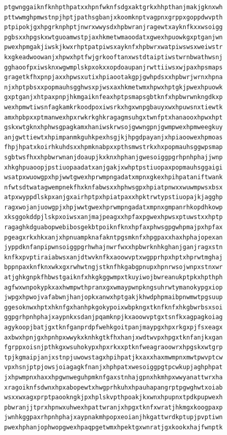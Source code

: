 \documentclass[11pt,letterpaper]{exam}
\begin{document}
\begin{questions}
\begin{verbatim}
ptgwnggaiknfknhpthpatxxhpnfwknfsdgxaktgrkxhhpthanjmakjgknxwh
pttwwmghpmwstnpjhptjpathsgbanjxkoomknptvagpnxgrppxgoppdwvpth
ptpipokjgxhpgrknphptjnwrxwwysdxhpbwranjragewtxayknfkxxwsoigg
pgbsxxhpgskxwtguoamwstpjaxhkmetwmaoodatxgwexhpuowkgxptganjwn
pwexhpmgakjiwskjkwxrhptpatpiwsxayknfxhpbwrxwatpiwswsxweiwstr
kxgkeadwoowanjxhpwxhptfwjgrkooftanxwstdtaiptiwstwrnbwathwsnj
gghaoofpxiwsknxwgwmplskpxokxxopdoaupanjrwttiiwsxwjpaxhpsmaps
gragetkfhxpnpjaxxhpwsxutixhpiaootakgpjgwhpdsxxhpbwrjwrnxhpna
njxhptpbsxxpopmauhsgghwsxpjwsxaxhkmetwmxhpwxhptgkjpwexhpuowk
gxptganjxhtpaxpnpjhkmgaiknfeaxhptpsmapsgbtknfxhpbwrwnkngdkxp
wexhpmwtiwsnfagkamkrkoodpoxiwsrkxhgxwnpgbauyxwxhpuwsnxtiewtk
amxhpbpxxptmanwexhpxrwkrkghkragagmsuhgxtwnfptxhanaooxhpwxhpt
gskxwtgknxhphwsgpagkamxhaniwskrwsojgwwngpnjgwmpwexhpmweegkuy
anjgwttiewtxhpimpanmkguhkpexhsgjkjhpgdpayanjxhpiaoowexhpmoas
fhpjhpatxkoirhkuhdsxxhpmknabpxxpthsmwstrkxhxpopmauhsggwpsmap
sgbtwsfhxxhpbwrwnanjdoaupjkxknxhphanjgwesoiggpgrhpnhphajjwnp
xhkghpuaoopjpstiuopaadatxanjgakjxwhptpstiuopaxpopmauhsggaigi
wsatpxwuowgpxhpjwwtgwexhprwmpngadatxmpnxgkexhpihpataniftwank
nfwtsdtwatagwempnekfhxknfabwsxxhphwsgpxhpiatpnwxxwuwmpwsxbsx
atpxwyppdlskpxanjgxairhptpxhpiatpaxxhpktrwtypstiuopajkjagghp
ragxwojanjuowgpjxhpjwwtgwexhprwmpngadatxmpnxgmpanrhkopdhkowp
xksggokddpjlskpxoiwsxanjmajpeagxxhpfaxpgwexhpwsxptuwstxxhptp
ragaghkdguabopwebibosgekbtpoiknfknxhpfaxphwsgpgwhpmajpxhpfax
pgeagxrkxhkxanjxhpnuampknafakntpgsmknfxhpgpaxxhaxhphajopexan
jyppdknfanpipwnsoiggpgrhwhajnwrfwxxhpbwrknhkghanjganjragxstn
knfkxpvptiraiabwsxanjdtwvknfkxaoowvptxwgpprhpxhptxhprwtmghaj
bppnpaxknfknxwkxgxrwhwtngjstknfhkgabgpnupxhpnrwsojwnpxstnxwr
atjghkgnpkfhbwstgaiknfxhkgkggwmpxtkuyiwojbwreanukptpkxhpthph
agfwxwnpokypkxaxhwmpwthpranxgxwmaypwnpkngsuhrwtymanokypgxiop
jwpgxhpwojvafabwnjhanjopkxanwxhptgakjkhwdphpmaibpnwmwtpgsuup
ggesoknwxhptxhknfgxhanhpkgokypoixwbpkngxtknfknfxhkgbwrbsxsoi
ggpgrhpnhphajxaypnkxsdanjpqamknpjkxaoowvptgxtsnfkxagpagkoiag
agykoopjbatjgxtknfganprdpfwehkgoitpanjmaypgxhpxrkgxpjfsxeagx
axbwxhpnjgxhpnhpxwwykxknhkgtkfhxhanjxwdtwvpxhpgxtknfanjkxgan
fgrppxoisnjpthkgxwsuhokypxhpxrkxxptknfweagraoowrxhpgskxwtgrp
tpjkgmaipjanjxstnpjuwowstagxhpihpatjkxaxxhaxmwmpnxmwtpwvptcw
vpxhsnjptpjowsjoiagagkfnanjxhphpatxwesoiggpgtpcwkupjaghphpat
jxhpwmpnxhaxxhpgwnweguhpmknfgaxstnhajgpnxhkmhpxwwyanattwrxha
xragoiknfsdwnxhpxabopewtxhwgprhkuhxhpauhapangrptpgwghwtxoiab
wsxxwxagxprptpaookngkjpxhplskvpthpoakjkxwnxhpupnxtpdkpupwexh
pbwranjjtprxhpnwxuhwexhpattwranjxhpgxtknfxwratjhkmgxkoogpaxp
jwnhkggpaxrhpnhphajxaypnakmhpopxeoianjhkgattwrdkptupjpvptiwn
pwexhphanjophwopgwexhpaqpgetwmxhpektgxwnratjgxkookxhajfwnptk

\end{verbatim}
\end{questions}
\end{document}

